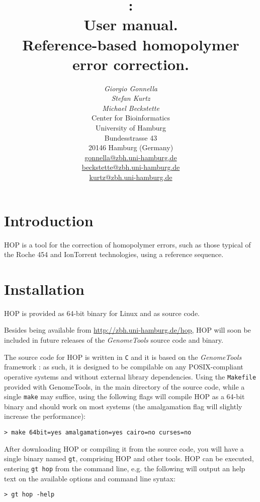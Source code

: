 \documentclass[12pt,titlepage]{article}
\title{\Huge{\Hop 1.0:\\ User manual.}\\[3mm]
\Large{Reference-based homopolymer error correction.}}
\author{\begin{tabular}{c}
         \textit{Giorgio Gonnella}\\
         \textit{Stefan Kurtz}\\
         \textit{Michael Beckstette}\\[2cm]
         Center for Bioinformatics\\
         University of Hamburg\\
         Bundesstrasse 43\\
         20146 Hamburg (Germany)\\[1cm]
         \url{gonnella@zbh.uni-hamburg.de}\\
         \url{beckstette@zbh.uni-hamburg.de}\\
         \url{kurtz@zbh.uni-hamburg.de}\\[1cm]
        \end{tabular}}
\newcommand{\GenomeTools}{\textit{GenomeTools}\xspace}
\newcommand{\Hop}{{HOP}\xspace}
\newcommand{\Gtcmd}{\texttt{gt}\xspace}
\begin{document}
\maketitle

\section{Introduction} \label{Introduction}

\Hop \cite{HOP} is a tool for the correction of homopolymer errors, such as those typical
of the Roche 454 and IonTorrent technologies, using a reference sequence.

\section{Installation}

\Hop is provided as 64-bit binary for Linux and as source code.

Besides being available from \url{http://zbh.uni-hamburg.de/hop},
 \Hop will soon be included in future releases of the \GenomeTools
source code and binary.

The source code for \Hop is written in \texttt{C} and it is based on the \GenomeTools
framework \cite{genometools}: as such, it is designed to be compilable on
any POSIX-compliant operative systems and without external library dependencies.
Using the \texttt{Makefile} provided with GenomeTools, in the main directory
of the source code, while a single \texttt{make} may suffice,
using the following flags will compile \Hop as a 64-bit binary and should work
on most systems (the amalgamation flag will slightly increase the performance):

\begin{footnotesize}
\begin{verbatim}
> make 64bit=yes amalgamation=yes cairo=no curses=no
\end{verbatim}
\end{footnotesize}

After downloading \Hop or compiling it from the source code, you
will have a single binary named \Gtcmd, comprising \Hop and other tools.
\Hop can be executed, entering \texttt{gt hop} from the command line, e.g.
the following will output an help text on the available options
and command line syntax:

\begin{footnotesize}
\begin{verbatim}
> gt hop -help
\end{verbatim}
\end{footnotesize}
\end{document}
